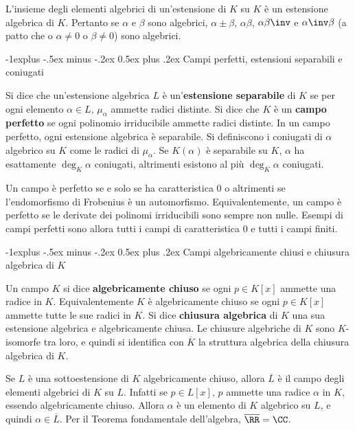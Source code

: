 \documentclass[10pt,landscape]{article}
\makeatletter
\renewcommand{\subsection}{\@startsection{subsection}{2}{0mm}%
	{-1explus -.5ex minus -.2ex}%
	{0.5ex plus .2ex}%
	{\normalfont\normalsize\bfseries}}
\makeatother
\begin{document}
\begin{multicols}{3}
		
		L'insieme degli elementi algebrici di un'estensione
		di $K$ su $K$ è un estensione algebrica di $K$.
		Pertanto se $\alpha$ e $\beta$ sono algebrici,
		$\alpha \pm \beta$, $\alpha \beta$, $\alpha \beta\inv$
		e $\alpha\inv \beta$ (a patto che o $\alpha \neq 0$ o
		$\beta \neq 0$) sono algebrici.  
		
		
		\subsection{Campi perfetti, estensioni separabili e coniugati}
		
		
		Si dice che un'estensione algebrica $L$ è un'\textbf{estensione separabile} di
		$K$ se per ogni elemento $\alpha \in L$,
		$\mu_\alpha$ ammette radici distinte. Si dice
		che $K$ è un \textbf{campo perfetto} se ogni
		polinomio irriducibile ammette radici distinte.
		In un campo perfetto, ogni estensione algebrica
		è separabile. Si definiscono i coniugati di
		$\alpha$ algebrico su $K$ come le radici
		di $\mu_\alpha$. Se $K(\alpha)$ è separabile su $K$,
		$\alpha$ ha esattamente $\deg_K \alpha$ coniugati,
		altrimenti esistono al più $\deg_K \alpha$ coniugati. \medskip
		
		
		Un campo è perfetto se e solo se ha caratteristica
		$0$ o altrimenti se l'endomorfismo di
		Frobenius è un automorfismo. Equivalentemente,
		un campo è perfetto se le derivate dei polinomi
		irriducibili sono sempre non nulle. Esempi di
		campi perfetti sono allora tutti i campi di
		caratteristica $0$ e tutti i campi finiti. 
		
		
		\subsection{Campi algebricamente chiusi e chiusura algebrica di $K$}
		
		Un campo $K$ si dice \textbf{algebricamente chiuso} se
		ogni $p \in K[x]$ ammette una radice in $K$. Equivalentemente $K$ è algebricamente chiuso se
		ogni $p \in K[x]$ ammette tutte le sue radici in $K$.
		Si dice \textbf{chiusura algebrica} di $K$
		una sua estensione algebrica e algebricamente
		chiusa. Le chiusure algebriche di $K$ sono
		$K$-isomorfe tra loro, e quindi si identifica
		con $\overline{K}$ la struttura algebrica della
		chiusura algebrica di $K$. \medskip
		
		
		Se $L$ è una sottoestensione di $K$ algebricamente
		chiuso, allora $\overline{L}$ è il campo degli
		elementi algebrici di $K$ su $L$. Infatti se
		$p \in L[x]$, $p$ ammette una radice $\alpha$ in $K$, essendo
		algebricamente chiuso. Allora $\alpha$ è un elemento
		di $K$ algebrico su $L$, e quindi $\alpha \in \overline{L}$. Per il Teorema fondamentale dell'algebra,
		$\overline{\RR} = \CC$.
		

\end{multicols}
\end{document}
